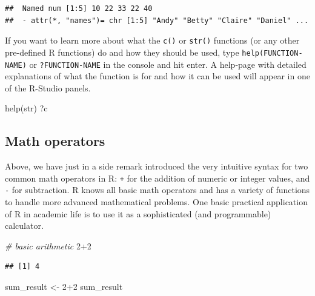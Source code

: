 \documentclass[
  12pt,
]{style/krantz}
\newenvironment{Shaded}{\begin{snugshade}}{\end{snugshade}}
\newcommand{\CommentTok}[1]{\textcolor[rgb]{0.56,0.35,0.01}{\textit{#1}}}
\newcommand{\DecValTok}[1]{\textcolor[rgb]{0.00,0.00,0.81}{#1}}
\newcommand{\FunctionTok}[1]{\textcolor[rgb]{0.00,0.00,0.00}{#1}}
\newcommand{\NormalTok}[1]{#1}
\newcommand{\OtherTok}[1]{\textcolor[rgb]{0.56,0.35,0.01}{#1}}
\newcommand{\SpecialCharTok}[1]{\textcolor[rgb]{0.00,0.00,0.00}{#1}}
\begin{document}
\begin{verbatim}
##  Named num [1:5] 10 22 33 22 40
##  - attr(*, "names")= chr [1:5] "Andy" "Betty" "Claire" "Daniel" ...
\end{verbatim}

If you want to learn more about what the \texttt{c()} or \texttt{str()} functions (or any other pre-defined R functions) do and how they should be used, type \texttt{help(FUNCTION-NAME)} or \texttt{?FUNCTION-NAME} in the console and hit enter. A help-page with detailed explanations of what the function is for and how it can be used will appear in one of the R-Studio panels.

\begin{Shaded}
\begin{Highlighting}[]
\FunctionTok{help}\NormalTok{(str)}
\NormalTok{?c}
\end{Highlighting}
\end{Shaded}

\hypertarget{math-operators}{%
\subsection{Math operators}\label{math-operators}}

Above, we have just in a side remark introduced the very intuitive syntax for two common math operators in R: \texttt{+} for the addition of numeric or integer values, and \texttt{-} for subtraction. R knows all basic math operators and has a variety of functions to handle more advanced mathematical problems. One basic practical application of R in academic life is to use it as a sophisticated (and programmable) calculator.

\begin{Shaded}
\begin{Highlighting}[]
\CommentTok{\# basic arithmetic}
\DecValTok{2}\SpecialCharTok{+}\DecValTok{2}
\end{Highlighting}
\end{Shaded}

\begin{verbatim}
## [1] 4
\end{verbatim}

\begin{Shaded}
\begin{Highlighting}[]
\NormalTok{sum\_result }\OtherTok{\textless{}{-}} \DecValTok{2}\SpecialCharTok{+}\DecValTok{2}
\NormalTok{sum\_result}
\end{Highlighting}
\end{Shaded}
\end{document}
